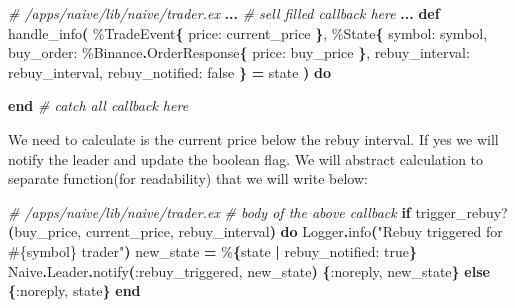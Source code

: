 \documentclass[
  oneside]{book}
\newenvironment{Shaded}{\begin{snugshade}}{\end{snugshade}}
\newcommand{\CommentTok}[1]{\textcolor[rgb]{0.56,0.35,0.01}{\textit{#1}}}
\newcommand{\ConstantTok}[1]{\textcolor[rgb]{0.56,0.35,0.01}{#1}}
\newcommand{\ControlFlowTok}[1]{\textcolor[rgb]{0.13,0.29,0.53}{\textbf{#1}}}
\newcommand{\FunctionTok}[1]{\textcolor[rgb]{0.13,0.29,0.53}{\textbf{#1}}}
\newcommand{\KeywordTok}[1]{\textcolor[rgb]{0.13,0.29,0.53}{\textbf{#1}}}
\newcommand{\NormalTok}[1]{#1}
\newcommand{\OperatorTok}[1]{\textcolor[rgb]{0.81,0.36,0.00}{\textbf{#1}}}
\newcommand{\OtherTok}[1]{\textcolor[rgb]{0.56,0.35,0.01}{#1}}
\newcommand{\StringTok}[1]{\textcolor[rgb]{0.31,0.60,0.02}{#1}}
\newcommand{\VariableTok}[1]{\textcolor[rgb]{0.00,0.00,0.00}{#1}}
\begin{document}
\begin{Shaded}
\begin{Highlighting}[]
  \CommentTok{\# /apps/naive/lib/naive/trader.ex}
  \OperatorTok{...}
  \CommentTok{\# sell filled callback here}
  \OperatorTok{...}
  \KeywordTok{def}\NormalTok{ handle\_info}\FunctionTok{(}
\NormalTok{        \%}\ConstantTok{TradeEvent}\FunctionTok{\{}
          \VariableTok{price:}\NormalTok{ current\_price}
        \FunctionTok{\}}\NormalTok{,}
\NormalTok{        \%}\ConstantTok{State}\FunctionTok{\{}
          \VariableTok{symbol:}\NormalTok{ symbol,}
          \VariableTok{buy\_order:}\NormalTok{ \%}\ConstantTok{Binance}\OperatorTok{.}\ConstantTok{OrderResponse}\FunctionTok{\{}
            \VariableTok{price:}\NormalTok{ buy\_price}
          \FunctionTok{\}}\NormalTok{,}
          \VariableTok{rebuy\_interval:}\NormalTok{ rebuy\_interval,}
          \VariableTok{rebuy\_notified:} \ConstantTok{false}
        \FunctionTok{\}} \OperatorTok{=}\NormalTok{ state}
      \FunctionTok{)} \KeywordTok{do}

  \KeywordTok{end}
  \CommentTok{\# catch all callback here}
\end{Highlighting}
\end{Shaded}

We need to calculate is the current price below the rebuy interval. If yes we will notify the leader and update the boolean flag. We will abstract calculation to separate function(for readability) that we will write below:

\begin{Shaded}
\begin{Highlighting}[]
    \CommentTok{\# /apps/naive/lib/naive/trader.ex}
    \CommentTok{\# body of the above callback}
    \ControlFlowTok{if}\NormalTok{ trigger\_rebuy?}\FunctionTok{(}\NormalTok{buy\_price, current\_price, rebuy\_interval}\FunctionTok{)} \KeywordTok{do}
      \ConstantTok{Logger}\OperatorTok{.}\NormalTok{info}\FunctionTok{(}\StringTok{"Rebuy triggered for }\OtherTok{\#\{}\NormalTok{symbol}\OtherTok{\}}\StringTok{ trader"}\FunctionTok{)}
\NormalTok{      new\_state }\OperatorTok{=}\NormalTok{ \%}\FunctionTok{\{}\NormalTok{state }\OperatorTok{|} \VariableTok{rebuy\_notified:} \ConstantTok{true}\FunctionTok{\}}
      \ConstantTok{Naive}\OperatorTok{.}\ConstantTok{Leader}\OperatorTok{.}\NormalTok{notify}\FunctionTok{(}\VariableTok{:rebuy\_triggered}\NormalTok{, new\_state}\FunctionTok{)}
      \FunctionTok{\{}\VariableTok{:noreply}\NormalTok{, new\_state}\FunctionTok{\}}
    \ControlFlowTok{else}
      \FunctionTok{\{}\VariableTok{:noreply}\NormalTok{, state}\FunctionTok{\}}
    \KeywordTok{end}
\end{Highlighting}
\end{Shaded}
\end{document}
